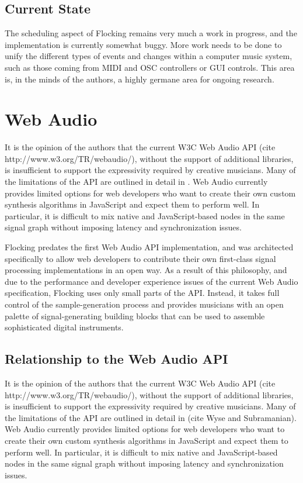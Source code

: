 \documentclass{article}
\begin{document}
\subsection{Current State}

The scheduling aspect of Flocking remains very much a work in progress, and the implementation is currently somewhat buggy. More work needs to be done to unify the different types of events and changes within a computer music system, such as those coming from MIDI and OSC controllers or GUI controls. This area is, in the minds of the authors, a highly germane area for ongoing research.

\section{Web Audio}

It is the opinion of the authors that the current W3C Web Audio API (cite http://www.w3.org/TR/webaudio/), without the support of additional libraries, is insufficient to support the expressivity required by creative musicians. Many of the limitations of the API are outlined in detail in \cite{DBLP:journals/comj/WyseS13}. Web Audio currently provides limited options for web developers who want to create their own custom synthesis algorithms in JavaScript and expect them to perform well. In particular, it is difficult to mix native and JavaScript-based nodes in the same signal graph without imposing latency and synchronization issues.

Flocking predates the first Web Audio API implementation, and was architected specifically to allow web developers to contribute their own first-class signal processing implementations in an open way. As a result of this philosophy, and due to the performance and developer experience issues of the current Web Audio specification, Flocking uses only small parts of the API. Instead, it takes full control of the sample-generation process and provides musicians with an open palette of signal-generating building blocks that can be used to assemble sophisticated digital instruments.

\subsection{Relationship to the Web Audio API}

It is the opinion of the authors that the current W3C Web Audio API (cite http://www.w3.org/TR/webaudio/), without the support of additional libraries, is insufficient to support the expressivity required by creative musicians. Many of the limitations of the API are outlined in detail in (cite Wyse and Subramanian). Web Audio currently provides limited options for web developers who want to create their own custom synthesis algorithms in JavaScript and expect them to perform well. In particular, it is difficult to mix native and JavaScript-based nodes in the same signal graph without imposing latency and synchronization issues.
\end{document}
